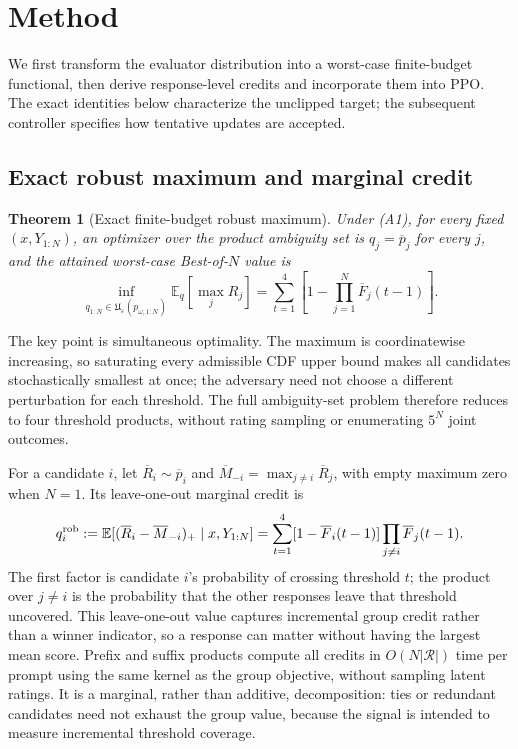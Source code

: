 \documentclass{article}
\newtheorem{theorem}{Theorem}
\theoremstyle{definition}
\theoremstyle{remark}
\begin{document}
\section{Method}
\label{sec:method}

We first transform the evaluator distribution into a worst-case finite-budget
functional, then derive response-level credits and incorporate them into PPO.
The exact identities below characterize the unclipped target; the subsequent
controller specifies how tentative updates are accepted.

\subsection{Exact robust maximum and marginal credit}
\label{subsec:exact-credit}

\begin{theorem}[Exact finite-budget robust maximum]
\label{thm:main-max}
Under (A1), for every fixed \((x,Y_{1:N})\), an optimizer over the product
ambiguity set is \(q_j=\overline p_j\) for every \(j\), and the attained
worst-case Best-of-\(N\) value is
\begin{equation}
\label{eq:robust-max-theorem}
\inf_{q_{1:N}\in\mathfrak U_{\varepsilon}(p_{\omega,1:N})}
\mathbb E_q[\max_jR_j]
=\sum_{t=1}^{4}\left[1-\prod_{j=1}^{N}\overline F_j(t-1)\right].
\end{equation}
\end{theorem}

The key point is simultaneous optimality.  The maximum is coordinatewise
increasing, so saturating every admissible CDF upper bound makes all candidates
stochastically smallest at once; the adversary need not choose a different
perturbation for each threshold.  The full ambiguity-set problem therefore
reduces to four threshold products, without rating sampling or enumerating
\(5^N\) joint outcomes.

For a candidate \(i\), let \(\overline R_i\sim\overline p_i\) and
\(\overline M_{-i}=\max_{j\ne i}\overline R_j\), with empty maximum zero
when \(N=1\). Its leave-one-out marginal
credit is
\begin{equation}
\label{eq:robust-credit-closed}
q_i^{\rm rob}:=\mathbb E[(\overline R_i-
\overline M_{-i})_+\mid x,Y_{1:N}]
=\sum_{t=1}^{4}[1-\overline F_i(t-1)]\prod_{j\ne i}\overline F_j(t-1).
\end{equation}
The first factor is candidate \(i\)'s probability of crossing threshold \(t\);
the product over \(j\ne i\) is the probability that the other responses leave
that threshold uncovered.  This leave-one-out value captures incremental group
credit rather than a winner indicator, so a response can matter without having
the largest mean score.  Prefix and suffix products compute all credits in
\(O(N|\mathcal R|)\) time per prompt using the same kernel as the group
objective, without sampling latent ratings. It is a
marginal, rather than additive, decomposition: ties or redundant candidates
need not exhaust the group value, because the signal is intended to measure
incremental threshold coverage.
\end{document}
